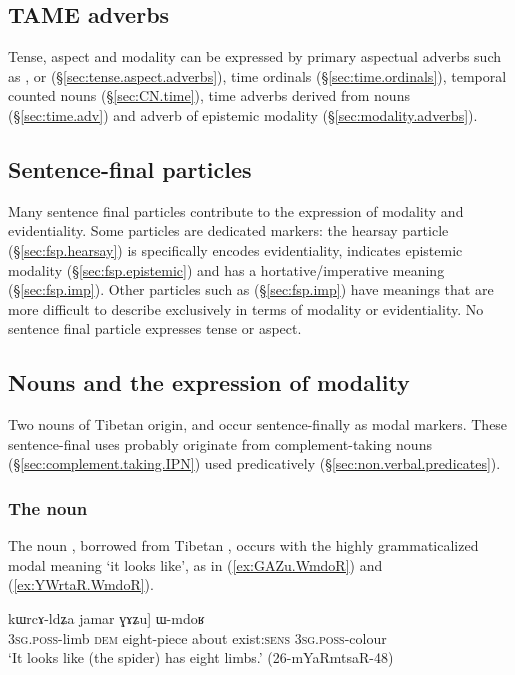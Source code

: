 \subsection{TAME adverbs} 
Tense, aspect and modality can be expressed by primary aspectual adverbs such as ,  or  (§\ref{sec:tense.aspect.adverbs}), time ordinals (§\ref{sec:time.ordinals}), temporal counted nouns (§\ref{sec:CN.time}), time adverbs derived from nouns (§\ref{sec:time.adv}) and adverb of epistemic modality (§\ref{sec:modality.adverbs}).


\subsection{Sentence-final particles} 
Many sentence final particles contribute to the expression of modality and evidentiality. Some particles are dedicated markers: the hearsay particle  (§\ref{sec:fsp.hearsay}) is specifically encodes evidentiality,   indicates epistemic modality (§\ref{sec:fsp.epistemic}) and  has a hortative/imperative meaning (§\ref{sec:fsp.imp}). Other particles such as  (§\ref{sec:fsp.imp}) have meanings that are more difficult to describe exclusively in terms of modality or evidentiality. No sentence final particle expresses tense or aspect.


\subsection{Nouns and the expression of modality} \label{sec:nouns.TAME}
Two nouns of Tibetan origin,  and  occur sentence-finally as modal markers. These sentence-final uses probably originate from complement-taking nouns (§\ref{sec:complement.taking.IPN}) used predicatively (§\ref{sec:non.verbal.predicates}).

\subsubsection{The noun  } \label{sec:WmdoR.TAME}
The noun , borrowed from Tibetan , occurs with the highly grammaticalized modal meaning `it looks like', as in (\ref{ex:GAZu.WmdoR}) and (\ref{ex:YWrtaR.WmdoR}).  


\begin{exe}
	\ex \label{ex:GAZu.WmdoR}
	\gll [ɯ-mɤlɤjaʁ nɯ, [...] kɯrcɤ-ldʑa jamar ɣɤʑu] ɯ-mdoʁ \\
	\textsc{3sg}.\textsc{poss}-limb \textsc{dem} { } eight-piece about exist:\textsc{sens} \textsc{3sg}.\textsc{poss}-colour \\
	\glt `It looks like (the spider) has eight limbs.' (26-mYaRmtsaR-48)
\end{exe}

